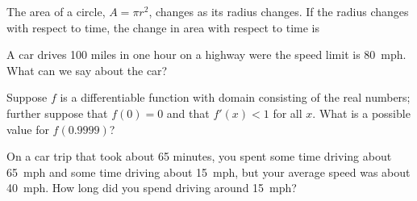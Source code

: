 \documentclass{ximera}
\newcommand{\recommendation}[1]{}
\newcommand{\GoodQuestions}[1]{}
\begin{document}
\begin{shuffle}
\begin{problem}
  The area of a circle, $A=\pi r^2$, changes as its radius changes. If
  the radius changes with respect to time, the change in area with
  respect to time is
  \begin{multipleChoice}
  \end{multipleChoice}
\end{problem}



\begin{problem}
  A car drives 100 miles in one hour on a highway were the speed limit
  is 80~mph.  What can we say about the car?
  \begin{multipleChoice}
  \end{multipleChoice}
\end{problem}

\begin{problem}
  Suppose $f$ is a differentiable function with domain consisting of
  the real numbers; further suppose that $f(0) = 0$ and that $f'(x) <
  1$ for all $x$.  What is a possible value for $f(0.9999)$?
  \begin{multipleChoice}
  \end{multipleChoice}
\end{problem}

\begin{problem}
  On a car trip that took about 65 minutes, you spent some time
  driving about 65~mph and some time driving about 15~mph, but your
  average speed was about 40~mph.  How long did you spend driving
  around 15~mph?
  \begin{multipleChoice}
  \end{multipleChoice}
\end{problem}


\end{shuffle}
\end{document}
